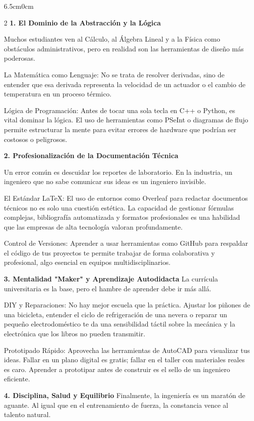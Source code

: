 \documentclass[10pt,twoside]{article}
\begin{document}
\begin{adjustwidth}{6.5cm}{0cm}
\begin{multicols}{2}
\textbf{1. El Dominio de la Abstracción y la Lógica}

Muchos estudiantes ven al Cálculo, al Álgebra Lineal y a la Física como obstáculos administrativos, pero en realidad son las herramientas de diseño más poderosas.

La Matemática como Lenguaje: No se trata de resolver derivadas, sino de entender que esa derivada representa la velocidad de un actuador o el cambio de temperatura en un proceso térmico.

Lógica de Programación: Antes de tocar una sola tecla en C++ o Python, es vital dominar la lógica. El uso de herramientas como PSeInt o diagramas de flujo permite estructurar la mente para evitar errores de hardware que podrían ser costosos o peligrosos.

\textbf{2. Profesionalización de la Documentación Técnica}

Un error común es descuidar los reportes de laboratorio. En la industria, un ingeniero que no sabe comunicar sus ideas es un ingeniero invisible.

El Estándar LaTeX: El uso de entornos como Overleaf para redactar documentos técnicos no es solo una cuestión estética. La capacidad de gestionar fórmulas complejas, bibliografía automatizada y formatos profesionales es una habilidad que las empresas de alta tecnología valoran profundamente.

Control de Versiones: Aprender a usar herramientas como GitHub para respaldar el código de tus proyectos te permite trabajar de forma colaborativa y profesional, algo esencial en equipos multidisciplinarios.

\textbf{3. Mentalidad "Maker" y Aprendizaje Autodidacta}
La currícula universitaria es la base, pero el hambre de aprender debe ir más allá.

DIY y Reparaciones: No hay mejor escuela que la práctica. Ajustar los piñones de una bicicleta, entender el ciclo de refrigeración de una nevera o reparar un pequeño electrodoméstico te da una sensibilidad táctil sobre la mecánica y la electrónica que los libros no pueden transmitir.

Prototipado Rápido: Aprovecha las herramientas de AutoCAD para visualizar tus ideas. Fallar en un plano digital es gratis; fallar en el taller con materiales reales es caro. Aprender a prototipar antes de construir es el sello de un ingeniero eficiente.

\textbf{4. Disciplina, Salud y Equilibrio}
Finalmente, la ingeniería es un maratón de aguante. Al igual que en el entrenamiento de fuerza, la constancia vence al talento natural.


\end{multicols}
\end{adjustwidth}
\end{document}
